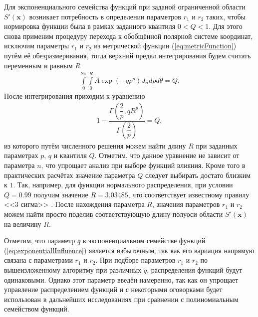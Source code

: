 Для экспоненциального семейства функций при заданой ограниченной области $S'(\boldsymbol{x})$ возникает потребность в определении параметров $r_1$ и $r_2$ таких, чтобы нормировка функции была в рамках заданного квантиля $0 < Q < 1$. Для этого снова применим процедуру перехода к обобщённой полярной системе координат, исключим параметры $r_1$ и $r_2$ из метрической функции (\ref{eq:metricFunction}) путём её обезразмеривания, тогда верхний предел интегрирования будем считать переменным и равным $R$
\begin{gather*}
	\int\limits_0^{2\pi}
		\int\limits_0^{R}
			A \exp \left(-q\rho^p \right) J_n
		d \rho
	d \theta = Q.
\end{gather*}
После интегрирования приходим к уравнению
\begin{gather}
	\label{eq:quantil}
	1 - \dfrac{
		\Gamma \left( \dfrac{2}{p}, q R^p \right)
		}{
		\Gamma \left( \dfrac{2}{p} \right)
		} = Q,
\end{gather}
из которого путём численного решения можем найти длину $R$ при заданных параметрах $p$, $q$ и квантиля $Q$. Отметим, что данное уравнение не зависит от параметра $n$, что упрощает анализ при выборе функций влияния. Кроме того в практических расчётах значение параметра $Q$ следует выбирать достато близким к $1$. Так, например, для функции нормального распределения, при условии $Q = 0.99$ получим значение $R = 3.03485$, что соответствует известному правилу <<3 сигма>> \cite{TeorVer}. После нахождения параметра $R$, значения параметров $r_1$ и $r_2$ можем найти просто поделив соответствующую длину полуоси области $S' (\boldsymbol{x})$ на величину $R$.

Отметим, что параметр $q$ в экспоненциальном семействе функций (\ref{eq:exponentiallInfluence}) является избыточным, так как его вариация напрямую связана с параметрами $r_1$ и $r_2$. При подборе параметров $r_1$ и $r_2$ по вышеизложенному алгоритму при различных $q$, распределения функций будут одинаковыми. Однако этот параметр введён намеренно, так как он упрощает управление распределением функций и с некоторыми оговорками будет использован в дальнейших исследованиях при сравнении с полиномиальным семейством функций.